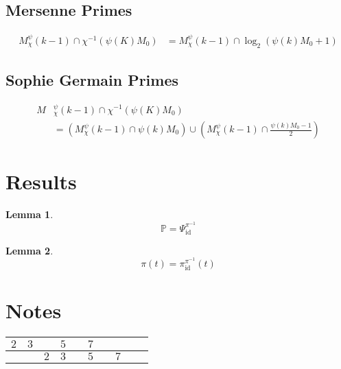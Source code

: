 \documentclass{article}
\newcommand{\inv}{^{-1}}
\DeclareMathOperator{\id}{id}
\newtheorem{lemma}{Lemma}
\begin{document}
	\subsection{Mersenne Primes}
	
	\begin{equation}
		\begin{split}
			M_χ^ψ(k-1) \cap χ\inv\left( ψ(K)M_0 \right) &= M_χ^ψ(k-1) \cap \log_2(ψ(k)M_0 + 1)
		\end{split}
	\end{equation}
	
	\subsection{Sophie Germain Primes}
	
	\begin{equation}
		\begin{split}
			M&_χ^ψ(k-1) \cap χ\inv\left( ψ(K)M_0 \right) \\
			&= (M_χ^ψ(k-1) \cap ψ(k)M_0) \cup (M_χ^ψ(k-1) \cap \frac{ψ(k)M_0 - 1}{2})
		\end{split}
	\end{equation}
	
	\section{Results}

	
	\begin{lemma}
		\begin{equation}
			\mathbb{P} = Ψ_{\id}^{π\inv}
		\end{equation}
	\end{lemma}
	
	\begin{lemma}
		\begin{equation}
			π(t) = π_{\id}^{π\inv}(t)
		\end{equation}
	\end{lemma}
	
	\section{Notes}
	
	\begin{tabular}{|c|c|c|c|c|c|c|c|c|c|}
		\hline
		$2$ & $3$ & & $5$ & & $7$ & & & & \\
		\hline
		& & $2$ & $3$ & & $5$ & & $7$ & &  \\
		\hline
	\end{tabular}
\end{document}
